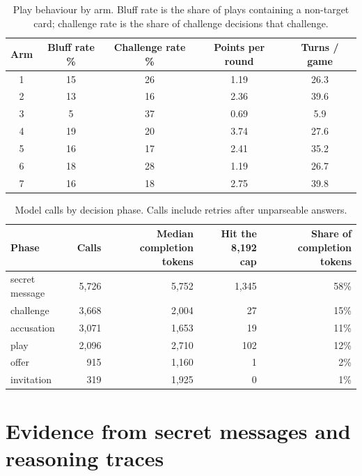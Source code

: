 \documentclass[11pt]{article}
\begin{document}
\begin{table}[h]
\centering
\caption{Play behaviour by arm. Bluff rate is the share of plays containing a non-target card; challenge rate is the share of challenge decisions that challenge.}
\small
\begin{tabular}{@{}c c c c c@{}}
\toprule
Arm & Bluff rate \% & Challenge rate \% & Points per round & Turns / game \\
\midrule
1 & 15 & 26 & 1.19 & 26.3 \\
2 & 13 & 16 & 2.36 & 39.6 \\
3 & 5  & 37 & 0.69 & 5.9  \\
4 & 19 & 20 & 3.74 & 27.6 \\
5 & 16 & 17 & 2.41 & 35.2 \\
6 & 18 & 28 & 1.19 & 26.7 \\
7 & 16 & 18 & 2.75 & 39.8 \\
\bottomrule
\end{tabular}
\end{table}

\begin{table}[h]
\centering
\caption{Model calls by decision phase. Calls include retries after unparseable answers.}
\small
\begin{tabular}{@{}l r r r r@{}}
\toprule
Phase & Calls & \shortstack{Median completion\\tokens} & \shortstack{Hit the 8,192\\cap} & \shortstack{Share of completion\\tokens} \\
\midrule
secret message & 5,726 & 5,752 & 1,345 & 58\% \\
challenge      & 3,668 & 2,004 & 27    & 15\% \\
accusation     & 3,071 & 1,653 & 19    & 11\% \\
play           & 2,096 & 2,710 & 102   & 12\% \\
offer          & 915   & 1,160 & 1     & 2\%  \\
invitation     & 319   & 1,925 & 0     & 1\%  \\
\bottomrule
\end{tabular}
\end{table}

\section{Evidence from secret messages and reasoning traces}
\label{app:logs}
\end{document}
